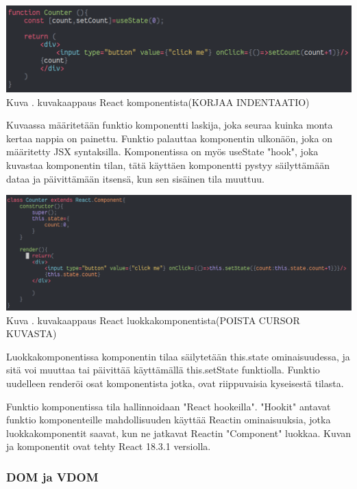 \bigskip
\includegraphics[width=15cm]{src/public/oppar/function_component.png}\\
Kuva \getImgCount{}. kuvakaappaus React komponentista(KORJAA INDENTAATIO)
\medskip

Kuvaassa \theimgCounter{} määritetään funktio komponentti laskija, joka seuraa kuinka monta kertaa nappia on painettu.
Funktio palauttaa komponentin ulkonäön, joka on määritetty JSX syntaksilla.
Komponentissa on myös useState "hook"{}, joka kuvastaa komponentin tilan,
tätä käyttäen komponentti pystyy säilyttämään dataa ja päivittämään itsensä, kun sen sisäinen tila muuttuu.
\medskip




\bigskip
\includegraphics[width=15cm]{src/public/oppar/class_.png}\\
Kuva \getImgCount{}. kuvakaappaus React luokkakomponentista(POISTA CURSOR KUVASTA)
\medskip



Luokkakomponentissa komponentin tilaa säilytetään this.state ominaisuudessa, ja sitä voi muuttaa tai päivittää käyttämällä this.setState funktiolla. 
Funktio uudelleen renderöi osat komponentista jotka, ovat riippuvaisia kyseisestä tilasta.\citemissing
\medskip


Funktio komponentissa tila hallinnoidaan "React hookeilla"{}. 
"Hookit"{} antavat funktio komponenteille mahdollisuuden käyttää Reactin ominaisuuksia, 
jotka luokkakomponentit saavat, kun ne jatkavat Reactin "Component"{} luokkaa.
Kuvan \prevImageCount{} ja \theimgCounter{} komponentit ovat tehty React 18.3.1 versiolla.
\medskip



\subsubsection{DOM ja VDOM}



